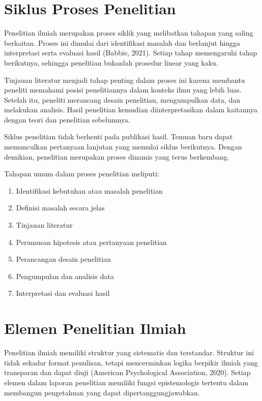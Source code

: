 \documentclass[
  indonesian,
  letterpaper,
  DIV=11,
  numbers=noendperiod]{scrreprt}
\providecommand{\tightlist}{%
  \setlength{\itemsep}{0pt}\setlength{\parskip}{0pt}}
\begin{document}
\section{Siklus Proses Penelitian}\label{siklus-proses-penelitian}

Penelitian ilmiah merupakan proses siklik yang melibatkan tahapan yang
saling berkaitan. Proses ini dimulai dari identifikasi masalah dan
berlanjut hingga interpretasi serta evaluasi hasil (Babbie, 2021).
Setiap tahap memengaruhi tahap berikutnya, sehingga penelitian bukanlah
prosedur linear yang kaku.

Tinjauan literatur menjadi tahap penting dalam proses ini karena
membantu peneliti memahami posisi penelitiannya dalam konteks ilmu yang
lebih luas. Setelah itu, peneliti merancang desain penelitian,
mengumpulkan data, dan melakukan analisis. Hasil penelitian kemudian
diinterpretasikan dalam kaitannya dengan teori dan penelitian
sebelumnya.

Siklus penelitian tidak berhenti pada publikasi hasil. Temuan baru dapat
memunculkan pertanyaan lanjutan yang memulai siklus berikutnya. Dengan
demikian, penelitian merupakan proses dinamis yang terus berkembang.

Tahapan umum dalam proses penelitian meliputi:

\begin{enumerate}
\def\labelenumi{\arabic{enumi}.}
\tightlist
\item
  Identifikasi kebutuhan atau masalah penelitian
\item
  Definisi masalah secara jelas
\item
  Tinjauan literatur
\item
  Perumusan hipotesis atau pertanyaan penelitian
\item
  Perancangan desain penelitian
\item
  Pengumpulan dan analisis data
\item
  Interpretasi dan evaluasi hasil
\end{enumerate}

\section{Elemen Penelitian Ilmiah}\label{elemen-penelitian-ilmiah}

Penelitian ilmiah memiliki struktur yang sistematis dan terstandar.
Struktur ini tidak sekadar format penulisan, tetapi mencerminkan logika
berpikir ilmiah yang transparan dan dapat diuji (American Psychological
Association, 2020). Setiap elemen dalam laporan penelitian memiliki
fungsi epistemologis tertentu dalam membangun pengetahuan yang dapat
dipertanggungjawabkan.
\end{document}
